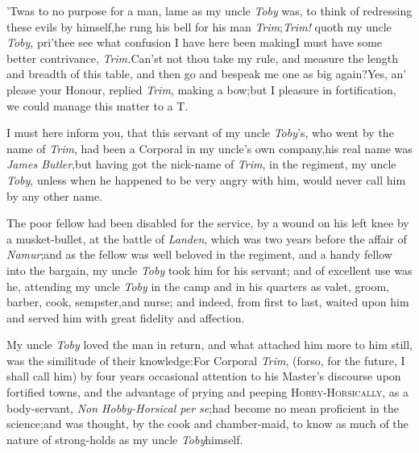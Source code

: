 \documentclass{article}
\begin{document}
’Twas to no purpose for a man, lame as my uncle
\textit{Toby} was, to think of redressing these evils by
himself,\tsk he rung his bell for his man
\textit{Trim};\tsk \textit{Trim!} quoth my uncle \textit{Toby},
pri’thee see what
confusion I have here been making\tsk I must have some better
contrivance, \textit{Trim.}\tsk\break Can’st not thou take my rule,
and measure the length and breadth of this table, and then go and
bespeak me one as big again?\tsh Yes, an’ please
your \hbox{Honour,} replied \textit{Trim}, making a bow;\tsk but I\break 
{}
pleasure in
fortification, we could ma\-nage this matter to a T.

\newpage
I must here inform you, that this servant of my uncle
\textit{Toby}’s, who went by the name of \textit{Trim}, had been
a Corporal in my uncle’s own company,\tsh his real name was
\textit{James Butler},\tsk but having got the nick-name of
\textit{Trim}, in the regiment, my uncle \textit{Toby}, unless when he
happened to be very angry with him, would never call him by any
other name.

The poor fellow had been disabled for the service, by a
wound on his left knee by a musket-bullet, at the battle of
\textit{Landen}, which was two years before the affair of
\textit{Namur};\tsk and as the fellow was well beloved in
the regiment, and a\break
handy fellow into the bargain, my uncle \textit{Toby} took
him for his servant; and of excellent use was he, attending
my uncle \textit{Toby} in the camp and in his quarters as
valet, groom, barber, cook, sempster,\pb and nurse; and
indeed, from first to last, waited upon him and served him
with great fidelity and affection.

My uncle \textit{Toby} loved the man in return, and what attached
him more to him still, was the similitude of their\break
knowledge:\tsh For Corporal \textit{Trim}, (for\break so, for the
future, I shall call him) by\break
four years occasional attention to his\break
Master’s discourse upon fortified towns,\break
and the advantage of prying and peeping\break
{}
\textsc{Hobby-Horsically}, as a body-servant,
\textit{Non Hobby-Horsical per se};\tsh had become no mean
proficient in the science;\break and was thought, by the cook and
cham\-ber-maid, to know as much of the nature of
strong-holds as my uncle \textit{Toby}\break himself.
\end{document}
